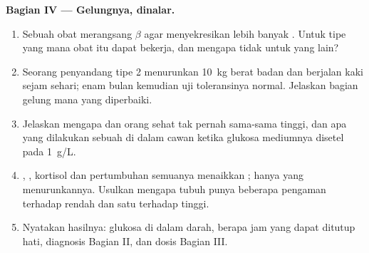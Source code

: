 \begin{problem}
\medskip
\noindent\textbf{Bagian IV --- Gelungnya, dinalar.}
\begin{enumerate}[resume]
  \item Sebuah obat merangsang  $\beta$ agar menyekresikan lebih
        banyak . Untuk tipe  yang mana obat itu dapat
        bekerja, dan mengapa tidak untuk yang lain?
  \item Seorang penyandang tipe 2 menurunkan \qty{10}{kg} berat badan
        dan berjalan kaki sejam sehari; enam bulan kemudian uji
        toleransinya normal. Jelaskan bagian gelung mana yang
        diperbaiki.
  \item Jelaskan mengapa  dan  orang sehat tak pernah
        sama-sama tinggi, dan apa yang dilakukan sebuah 
        di dalam cawan ketika glukosa mediumnya disetel pada
        \qty{1}{g/L}.
  \item {}, , kortisol dan  pertumbuhan semuanya
        menaikkan ; hanya  yang menurunkannya. Usulkan
        mengapa tubuh punya beberapa pengaman terhadap  rendah
        dan satu terhadap  tinggi.
  \item Nyatakan hasilnya: glukosa di dalam darah, berapa jam yang
        dapat ditutup hati, diagnosis Bagian II, dan dosis Bagian III.
\end{enumerate}
\end{problem}
